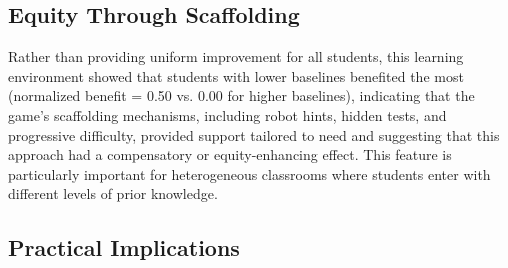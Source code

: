 \documentclass[conference]{IEEEtran}
\begin{document}

\subsection{Equity Through Scaffolding}
Rather than providing uniform improvement for all students, this learning environment showed that students with lower baselines benefited the most (normalized benefit = 0.50 vs. 0.00 for higher baselines), indicating that the game’s scaffolding mechanisms, including robot hints, hidden tests, and progressive difficulty, provided support tailored to need and suggesting that this approach had a compensatory or equity-enhancing effect. This feature is particularly important for heterogeneous classrooms where students enter with different levels of prior knowledge.


\subsection{Practical Implications}
\end{document}
